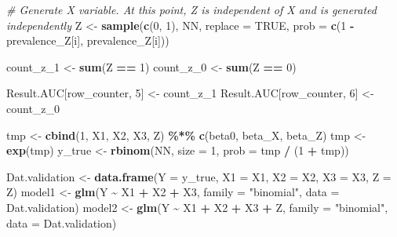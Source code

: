 \documentclass[
]{article}
\newenvironment{Shaded}{\begin{snugshade}}{\end{snugshade}}
\newcommand{\AttributeTok}[1]{\textcolor[rgb]{0.13,0.29,0.53}{#1}}
\newcommand{\CommentTok}[1]{\textcolor[rgb]{0.56,0.35,0.01}{\textit{#1}}}
\newcommand{\ConstantTok}[1]{\textcolor[rgb]{0.56,0.35,0.01}{#1}}
\newcommand{\DecValTok}[1]{\textcolor[rgb]{0.00,0.00,0.81}{#1}}
\newcommand{\FunctionTok}[1]{\textcolor[rgb]{0.13,0.29,0.53}{\textbf{#1}}}
\newcommand{\NormalTok}[1]{#1}
\newcommand{\OtherTok}[1]{\textcolor[rgb]{0.56,0.35,0.01}{#1}}
\newcommand{\SpecialCharTok}[1]{\textcolor[rgb]{0.81,0.36,0.00}{\textbf{#1}}}
\newcommand{\StringTok}[1]{\textcolor[rgb]{0.31,0.60,0.02}{#1}}
\begin{document}
\begin{Shaded}
\begin{Highlighting}[]
    \CommentTok{\# Generate X variable. At this point, Z is independent of X and is generated independently}
\NormalTok{    Z }\OtherTok{\textless{}{-}} \FunctionTok{sample}\NormalTok{(}\FunctionTok{c}\NormalTok{(}\DecValTok{0}\NormalTok{, }\DecValTok{1}\NormalTok{), NN, }\AttributeTok{replace =} \ConstantTok{TRUE}\NormalTok{, }\AttributeTok{prob =} \FunctionTok{c}\NormalTok{(}\DecValTok{1} \SpecialCharTok{{-}}\NormalTok{ prevalence\_Z[i], prevalence\_Z[i]))}
    
\NormalTok{    count\_z\_1 }\OtherTok{\textless{}{-}} \FunctionTok{sum}\NormalTok{(Z }\SpecialCharTok{==} \DecValTok{1}\NormalTok{)}
\NormalTok{    count\_z\_0 }\OtherTok{\textless{}{-}} \FunctionTok{sum}\NormalTok{(Z }\SpecialCharTok{==} \DecValTok{0}\NormalTok{)}
    
\NormalTok{    Result.AUC[row\_counter, }\DecValTok{5}\NormalTok{] }\OtherTok{\textless{}{-}}\NormalTok{ count\_z\_1}
\NormalTok{    Result.AUC[row\_counter, }\DecValTok{6}\NormalTok{] }\OtherTok{\textless{}{-}}\NormalTok{ count\_z\_0}
    
    
\NormalTok{    tmp }\OtherTok{\textless{}{-}} \FunctionTok{cbind}\NormalTok{(}\DecValTok{1}\NormalTok{, X1, X2, X3, Z) }\SpecialCharTok{\%*\%} \FunctionTok{c}\NormalTok{(beta0, beta\_X, beta\_Z)}
\NormalTok{    tmp }\OtherTok{\textless{}{-}} \FunctionTok{exp}\NormalTok{(tmp)}
\NormalTok{    y\_true }\OtherTok{\textless{}{-}} \FunctionTok{rbinom}\NormalTok{(NN, }\AttributeTok{size =} \DecValTok{1}\NormalTok{, }\AttributeTok{prob =}\NormalTok{ tmp }\SpecialCharTok{/}\NormalTok{ (}\DecValTok{1} \SpecialCharTok{+}\NormalTok{ tmp))}
    
\NormalTok{    Dat.validation }\OtherTok{\textless{}{-}} \FunctionTok{data.frame}\NormalTok{(}\AttributeTok{Y =}\NormalTok{ y\_true, }\AttributeTok{X1 =}\NormalTok{ X1, }\AttributeTok{X2 =}\NormalTok{ X2, }\AttributeTok{X3 =}\NormalTok{ X3, }\AttributeTok{Z =}\NormalTok{ Z)}
\NormalTok{    model1 }\OtherTok{\textless{}{-}} \FunctionTok{glm}\NormalTok{(Y }\SpecialCharTok{\textasciitilde{}}\NormalTok{ X1 }\SpecialCharTok{+}\NormalTok{ X2 }\SpecialCharTok{+}\NormalTok{ X3, }\AttributeTok{family =} \StringTok{"binomial"}\NormalTok{, }\AttributeTok{data =}\NormalTok{ Dat.validation)}
\NormalTok{    model2 }\OtherTok{\textless{}{-}} \FunctionTok{glm}\NormalTok{(Y }\SpecialCharTok{\textasciitilde{}}\NormalTok{ X1 }\SpecialCharTok{+}\NormalTok{ X2 }\SpecialCharTok{+}\NormalTok{ X3 }\SpecialCharTok{+}\NormalTok{ Z, }\AttributeTok{family =} \StringTok{"binomial"}\NormalTok{, }\AttributeTok{data =}\NormalTok{ Dat.validation)}
    

\end{Highlighting}
\end{Shaded}
\end{document}
